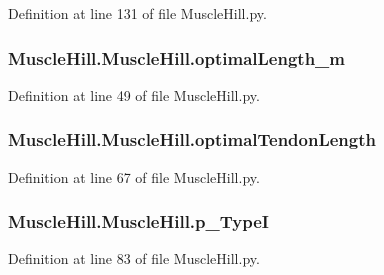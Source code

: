 Definition at line 131 of file Muscle\+Hill.\+py.

\subsubsection[{\texorpdfstring{optimal\+Length\+\_\+m}{optimalLength_m}}]{\setlength{\rightskip}{0pt plus 5cm}Muscle\+Hill.\+Muscle\+Hill.\+optimal\+Length\+\_\+m}\hypertarget{class_muscle_hill_1_1_muscle_hill_a36f410007232d947d44cd7dc7b5369eb}{}\label{class_muscle_hill_1_1_muscle_hill_a36f410007232d947d44cd7dc7b5369eb}


Definition at line 49 of file Muscle\+Hill.\+py.

\subsubsection[{\texorpdfstring{optimal\+Tendon\+Length}{optimalTendonLength}}]{\setlength{\rightskip}{0pt plus 5cm}Muscle\+Hill.\+Muscle\+Hill.\+optimal\+Tendon\+Length}\hypertarget{class_muscle_hill_1_1_muscle_hill_ae78df3a4cbb5899d12be637b75213ddc}{}\label{class_muscle_hill_1_1_muscle_hill_ae78df3a4cbb5899d12be637b75213ddc}


Definition at line 67 of file Muscle\+Hill.\+py.

\subsubsection[{\texorpdfstring{p\+\_\+\+TypeI}{p_TypeI}}]{\setlength{\rightskip}{0pt plus 5cm}Muscle\+Hill.\+Muscle\+Hill.\+p\+\_\+\+TypeI}\hypertarget{class_muscle_hill_1_1_muscle_hill_adcb089ccf7175739f980997d3d8fadb4}{}\label{class_muscle_hill_1_1_muscle_hill_adcb089ccf7175739f980997d3d8fadb4}


Definition at line 83 of file Muscle\+Hill.\+py.

